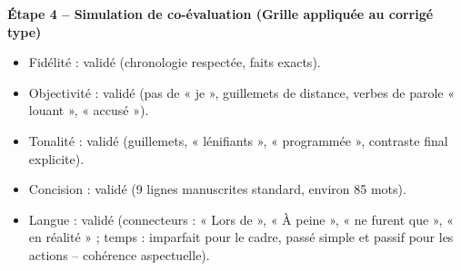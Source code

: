 \documentclass[11pt]{article}
\begin{document}
\begin{exoresolu}
\textbf{Étape 4 -- Simulation de co-évaluation (Grille appliquée au corrigé type)}
\begin{itemize}
    \item Fidélité : validé (chronologie respectée, faits exacts).
    \item Objectivité : validé (pas de « je », guillemets de distance, verbes de parole « louant », « accusé »).
    \item Tonalité : validé (guillemets, « lénifiants », « programmée », contraste final explicite).
    \item Concision : validé (9 lignes manuscrites standard, environ 85 mots).
    \item Langue : validé (connecteurs : « Lors de », « À peine », « ne furent que », « en réalité » ; temps : imparfait pour le cadre, passé simple et passif pour les actions -- cohérence aspectuelle).
\end{itemize}
\end{exoresolu}
\end{document}
